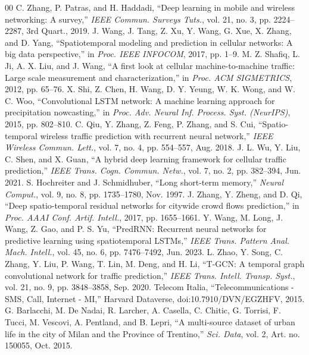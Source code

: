 \documentclass[conference]{IEEEtran}
\begin{document}
\begin{thebibliography}{00}
 C. Zhang, P. Patras, and H. Haddadi, ``Deep learning in mobile and wireless networking: A survey,'' \textit{IEEE Commun. Surveys Tuts.}, vol. 21, no. 3, pp. 2224--2287, 3rd Quart., 2019.
 J. Wang, J. Tang, Z. Xu, Y. Wang, G. Xue, X. Zhang, and D. Yang, ``Spatiotemporal modeling and prediction in cellular networks: A big data perspective,'' in \textit{Proc. IEEE INFOCOM}, 2017, pp. 1--9.
 M. Z. Shafiq, L. Ji, A. X. Liu, and J. Wang, ``A first look at cellular machine-to-machine traffic: Large scale measurement and characterization,'' in \textit{Proc. ACM SIGMETRICS}, 2012, pp. 65--76.
 X. Shi, Z. Chen, H. Wang, D. Y. Yeung, W. K. Wong, and W. C. Woo, ``Convolutional LSTM network: A machine learning approach for precipitation nowcasting,'' in \textit{Proc. Adv. Neural Inf. Process. Syst. (NeurIPS)}, 2015, pp. 802--810.
 C. Qiu, Y. Zhang, Z. Feng, P. Zhang, and S. Cui, ``Spatio-temporal wireless traffic prediction with recurrent neural network,'' \textit{IEEE Wireless Commun. Lett.}, vol. 7, no. 4, pp. 554--557, Aug. 2018.
 J. L. Wu, Y. Liu, C. Shen, and X. Guan, ``A hybrid deep learning framework for cellular traffic prediction,'' \textit{IEEE Trans. Cogn. Commun. Netw.}, vol. 7, no. 2, pp. 382--394, Jun. 2021.
 S. Hochreiter and J. Schmidhuber, ``Long short-term memory,'' \textit{Neural Comput.}, vol. 9, no. 8, pp. 1735--1780, Nov. 1997.
 J. Zhang, Y. Zheng, and D. Qi, ``Deep spatio-temporal residual networks for citywide crowd flows prediction,'' in \textit{Proc. AAAI Conf. Artif. Intell.}, 2017, pp. 1655--1661.
 Y. Wang, M. Long, J. Wang, Z. Gao, and P. S. Yu, ``PredRNN: Recurrent neural networks for predictive learning using spatiotemporal LSTMs,'' \textit{IEEE Trans. Pattern Anal. Mach. Intell.}, vol. 45, no. 6, pp. 7476--7492, Jun. 2023.
 L. Zhao, Y. Song, C. Zhang, Y. Liu, P. Wang, T. Lin, M. Deng, and H. Li, ``T-GCN: A temporal graph convolutional network for traffic prediction,'' \textit{IEEE Trans. Intell. Transp. Syst.}, vol. 21, no. 9, pp. 3848--3858, Sep. 2020.
 Telecom Italia, ``Telecommunications - SMS, Call, Internet - MI,'' Harvard Dataverse, doi:10.7910/DVN/EGZHFV, 2015.
 G. Barlacchi, M. De Nadai, R. Larcher, A. Casella, C. Chitic, G. Torrisi, F. Tucci, M. Vescovi, A. Pentland, and B. Lepri, ``A multi-source dataset of urban life in the city of Milan and the Province of Trentino,'' \textit{Sci. Data}, vol. 2, Art. no. 150055, Oct. 2015.
\end{thebibliography}
\end{document}
